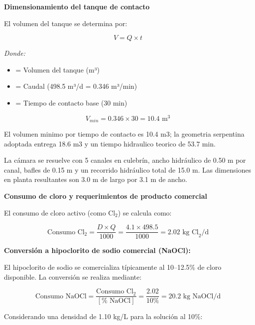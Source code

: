\documentclass[12pt,a4paper]{article}
\begin{document}
\textbf{Dimensionamiento del tanque de contacto}

El volumen del tanque se determina por:

\begin{equation}
V = Q \times t
\end{equation}

\textit{Donde:}
\begin{itemize}[noitemsep,leftmargin=2em]
    \item[$V$] = Volumen del tanque (m³)
    \item[$Q$] = Caudal (498.5 m³/d = 0.346 m³/min)
    \item[$t$] = Tiempo de contacto base (30 min)
\end{itemize}

\begin{equation}
V_{min} = 0.346 \times 30 = 10.4 \text{ m}^3
\end{equation}

El volumen minimo por tiempo de contacto es 10.4 m3; la geometria serpentina adoptada entrega 18.6 m3 y un tiempo hidraulico teorico de 53.7 min.

La cámara se resuelve con 5 canales en culebrín, ancho hidráulico de 0.50 m por canal, bafles de 0.15 m y un recorrido hidráulico total de 15.0 m. Las dimensiones en planta resultantes son 3.0 m de largo por 3.1 m de ancho.

\textbf{Consumo de cloro y requerimientos de producto comercial}

El consumo de cloro activo (como Cl$_2$) se calcula como:

\begin{equation}
\text{Consumo Cl}_2 = \frac{D \times Q}{1000} = \frac{4.1 \times 498.5}{1000} = 2.02 \text{ kg Cl}_2\text{/d}
\end{equation}

\textbf{Conversión a hipoclorito de sodio comercial (NaOCl):}

El hipoclorito de sodio se comercializa típicamente al 10--12.5\% de cloro disponible. La conversión se realiza mediante:

\begin{equation}
\text{Consumo NaOCl} = \frac{\text{Consumo Cl}_2}{[\% \text{ NaOCl}]} = \frac{2.02}{10\%} = 20.2 \text{ kg NaOCl/d}
\end{equation}

Considerando una densidad de 1.10 kg/L para la solución al 10\%:
\end{document}
